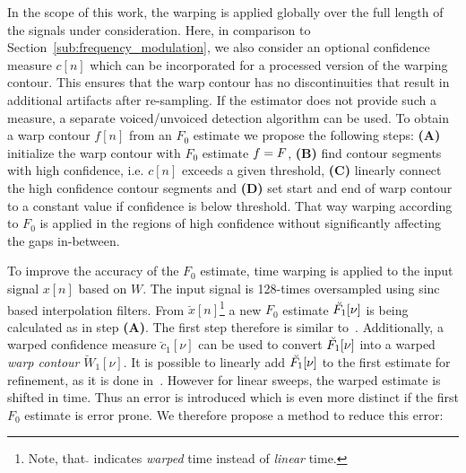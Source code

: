 In the scope of this work, the warping is applied globally over the full length of the signals under consideration. Here, in comparison to Section~\ref{sub:frequency_modulation}, we also consider an optional confidence measure $c[n]$ which can be incorporated for a processed version of the warping contour. This ensures that the warp contour has no discontinuities that result in additional artifacts after re-sampling. If the estimator does not provide such a measure, a separate voiced/unvoiced detection algorithm can be used. To obtain a warp contour $f[n]$ from an $F_0$ estimate we propose the following steps: \textbf{(A)} initialize the warp contour with $F_0$ estimate $f = {F}$, \textbf{(B)} find contour segments with high confidence, i.e. $c[n]$ exceeds a given threshold, \textbf{(C)} linearly connect the high confidence contour segments and \textbf{(D)} set start and end of warp contour to a constant value if confidence is below threshold. That way warping according to $F_0$ is applied in the regions of high confidence without significantly affecting the gaps in-between.
\par
To improve the accuracy of the $F_0$ estimate, time warping is applied to the input signal $x[n]$ based on $W$. The input signal is 128-times oversampled using sinc based interpolation filters.
From $\breve{x}[n]$\footnote{Note, that $\breve{}$ indicates \emph{warped} time instead of \emph{linear} time.} a new $F_0$ estimate $\breve{{F}_1}[\nu]$ is being calculated as in step \textbf{(A)}. The first step therefore is similar to~\cite{resch07}. Additionally, a warped confidence measure $\breve{c}_1[\nu]$ can be used to convert $\breve{{F}_1}[\nu]$ into a warped \emph{warp contour} $\breve{W}_1[\nu]$. It is possible to linearly add $\breve{{F}_1}[\nu]$ to the first estimate for refinement, as it is done in~\cite{azarov12}. However for linear sweeps, the warped estimate is shifted in time. Thus an error is introduced which is even more distinct if the first $F_0$ estimate is error prone. We therefore propose a method to reduce this error:
